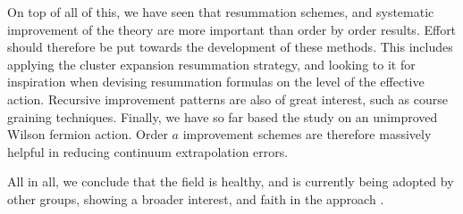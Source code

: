 On top of all of this, we have seen that resummation schemes, and systematic
improvement of the theory are more important than order by order results. Effort
should therefore be put towards the development of these methods. This includes
applying the cluster expansion resummation strategy, and looking to it for
inspiration when devising resummation formulas on the level of the effective
action. Recursive improvement patterns are also of great interest, such as
course graining techniques. Finally, we have so far based the study on an
unimproved Wilson fermion action. Order $a$ improvement schemes are therefore
massively helpful in reducing continuum extrapolation errors.

All in all, we conclude that the field is healthy, and is currently being
adopted by other groups, showing a broader interest, and faith in the approach
\citep{Scior:2015vra,Scior:2016fso,Rindlisbacher:2015pea}.
